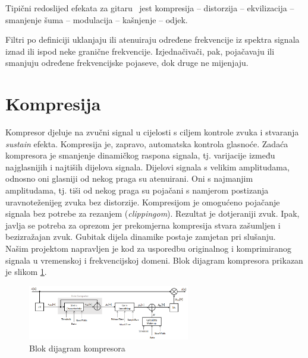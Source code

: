 \documentclass[conference]{IEEEtran}
\begin{document}
Tipični redoslijed efekata za gitaru~\cite{b1} jest kompresija – distorzija – ekvilizacija – smanjenje šuma
– modulacija – kašnjenje – odjek.

Filtri po definiciji uklanjaju ili atenuiraju određene frekvencije iz spektra signala iznad
ili ispod neke granične frekvencije. Izjednačivači, pak, pojačavaju ili smanjuju određene frekvencijske
pojaseve, dok druge ne mijenjaju.



\section{Kompresija}

Kompresor djeluje na zvučni signal u cijelosti s ciljem kontrole zvuka i stvaranja \textit{sustain}
efekta. Kompresija je, zapravo, automatska kontrola glasnoće. Zadaća kompresora je smanjenje
dinamičkog raspona signala, tj. varijacije između najglasnijih i najtiših dijelova signala.
Dijelovi signala s velikim amplitudama, odnosno oni glasniji od nekog praga su atenuirani. Oni s
najmanjim amplitudama, tj. tiši od nekog praga su pojačani s namjerom postizanja uravnoteženijeg zvuka
bez distorzije. Kompresijom je omogućeno pojačanje signala bez potrebe za rezanjem (\textit{clippingom}).
Rezultat je dotjeraniji zvuk. Ipak, javlja se potreba za oprezom jer prekomjerna kompresija stvara
zašumljen i bezizražajan zvuk. Gubitak dijela dinamike postaje zamjetan pri slušanju.\\
Našim projektom napravljen je kod za usporedbu originalnog i komprimiranog signala u vremenskoj i
frekvencijskoj domeni. Blok dijagram kompresora prikazan je slikom \ref{kompresija}.

\begin{figure}[H]
    \includegraphics[width=200pt]{slike/kompresija.png}
    \centering
    \caption{Blok dijagram kompresora}
    \label{kompresija}
\end{figure}
\end{document}

